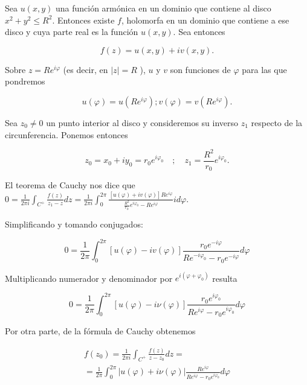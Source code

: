 \documentclass[10pt]{article}
\theoremstyle{plain}
\theoremstyle{definition}
\theoremstyle{remark}
\begin{document}
Sea $u(x, y)$ una función armónica en un dominio que contiene al disco $x^{2}+y^{2} \leqslant R^{2}$. Entonces existe $f$, holomorfa en un dominio que contiene a ese disco y cuya parte real es la función $u(x, y)$. Sea entonces

$$
f(z)=u(x, y)+i v(x, y) .
$$

Sobre $z=R e^{i \varphi}$ (es decir, en $|z|=R$ ), $u$ y $v$ son funciones de $\varphi$ para las que pondremos


\begin{equation*}
u(\varphi)=u\left(R e^{i \varphi}\right) ; v(\varphi)=v\left(R e^{i \varphi}\right) . \tag{15-1}
\end{equation*}


Sea $z_{0} \neq 0$ un punto interior al disco y consideremos su inverso $z_{1}$ respecto de la circunferencia. Ponemos entonces


\begin{equation*}
z_{0}=x_{0}+i y_{0}=r_{0} e^{i \varphi_{0}} \quad ; \quad z_{1}=\frac{R^{2}}{r_{0}} e^{i \varphi_{0}} . \tag{15-2}
\end{equation*}


El teorema de Cauchy nos dice que\\
$0=\frac{1}{2 \pi i} \int_{C^{+}} \frac{f(z)}{z_{1}-z} d z=\frac{1}{2 \pi i} \int_{0}^{2 \pi} \frac{[u(\varphi)+i v(\varphi)] R e^{i \varphi}}{\frac{R^{2}}{r_{0}} e^{i \varphi_{0}}-R e^{i \varphi}} i d \varphi$.

Simplificando y tomando conjugados:

$$
0=\frac{1}{2 \pi} \int_{0}^{2 \pi}[u(\varphi)-i v(\varphi)] \frac{r_{0} e^{-i \varphi}}{R e^{-i \varphi_{0}}-r_{0} e^{-i \varphi}} d \varphi
$$

Multiplicando numerador y denominador por $e^{i\left(\varphi+\varphi_{0}\right)}$ resulta

$$
0=\frac{1}{2 \pi} \int_{0}^{2 \pi}[u(\varphi)-i \nu(\varphi)] \frac{r_{0} e^{i \varphi_{0}}}{R e^{i \varphi}-r_{0} e^{i \varphi_{0}}} d \varphi
$$

Por otra parte, de la fórmula de Cauchy obtenemos

$$
\begin{gathered}
f\left(z_{0}\right)=\frac{1}{2 \pi i} \int_{C^{+}} \frac{f(z)}{z-z_{0}} d z= \\
=\frac{1}{2 \pi} \int_{0}^{2 \pi}|u(\varphi)+i \nu(\varphi)| \frac{R e^{i \varphi}}{R e^{i \varphi}-r_{0} e^{i \varphi_{0}}} d \varphi
\end{gathered}
$$
\end{document}
